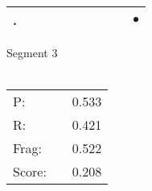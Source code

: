\documentclass[landscape]{article}
\newcommand{\ssp}{\hspace{2pt}}
\newcommand{\mex}{\cellcolor{g}$\bullet$}
\begin{document}
\begin{tabular}{|l|p{10pt}|p{10pt}|p{10pt}|p{10pt}|p{10pt}|p{10pt}|p{10pt}|p{10pt}|p{10pt}|}
\hline
\ssp \cellcolor{ref8}. \ssp&\hspace{2pt}&\hspace{2pt}&\hspace{2pt}&\hspace{2pt}&\hspace{2pt}&\hspace{2pt}&\hspace{2pt}&\hspace{2pt}&\hspace{2pt}\mex\\
\hline
\end{tabular}

\vspace{6pt}
\noindent Segment 3\\\\
\noindent\begin{tabular}{lm{12pt}r}
\hline
P:&&0.533\\
R:&&0.421\\
Frag:&&0.522\\
Score:&&0.208\\
\end{tabular}

\newpage
\end{document}
